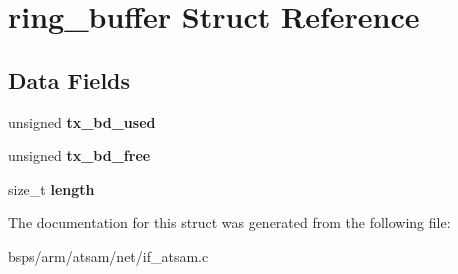\hypertarget{structring__buffer}{}\section{ring\+\_\+buffer Struct Reference}
\label{structring__buffer}
\subsection*{Data Fields}
\begin{DoxyCompactItemize}
\item 
\mbox{\label{structring__buffer_afa50abcf487ba0747aee6a95255a5e4f}} 
unsigned {\bfseries tx\+\_\+bd\+\_\+used}
\item 
\mbox{\label{structring__buffer_a3dce89b7165fb07bb04d9ad474c6f49d}} 
unsigned {\bfseries tx\+\_\+bd\+\_\+free}
\item 
\mbox{\label{structring__buffer_a8106806c3e5c5b840190c12a1bc65d64}} 
size\+\_\+t {\bfseries length}
\end{DoxyCompactItemize}


The documentation for this struct was generated from the following file\+:\begin{DoxyCompactItemize}
\item 
bsps/arm/atsam/net/if\+\_\+atsam.\+c\end{DoxyCompactItemize}
